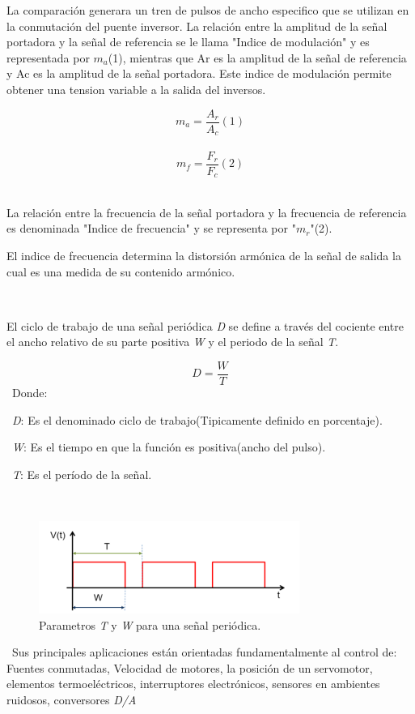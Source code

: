 \documentclass[12pt,letterpaper]{article}
\begin{document}
La comparación generara un tren de pulsos de ancho especifico que se utilizan en la conmutación del puente inversor. La relación entre la amplitud de la señal portadora y la señal de referencia se le llama "Indice de modulación" y es representada por $m_a$(1), mientras que Ar es la amplitud de la señal de referencia y Ac es la amplitud de la señal portadora. Este indice de modulación permite obtener una tension variable a la salida del inversos.
\

$$m_a = \frac{A_r}{A_c}(1)$$
\
$$m_f = \frac{F_r}{F_c}(2)$$
\

La relación entre la frecuencia de la señal portadora y la frecuencia de referencia es denominada "Indice de frecuencia" y se representa por "$m_r$"(2).
\

El indice de frecuencia determina la distorsión armónica de la señal de salida la cual es una medida de su contenido armónico.
\

\

El ciclo de trabajo de una señal periódica \textit{D} se define a través del cociente entre el ancho relativo de su parte positiva \textit{W} y el periodo de la señal \textit{T}.
\

$$D=\frac{W}{T}$$
\
Donde:

\
\textit{D}: Es el denominado ciclo de trabajo(Tipicamente definido en porcentaje).

\
\textit{W}: Es el tiempo en que la función es positiva(ancho del pulso).

\
\textit{T}: Es el período de la señal.

\

\begin{figure}[h!]
\begin{center}
\includegraphics[scale=0.8]{Parametros.png} 
\caption{Parametros \textit{T} y \textit{W} para una señal periódica.}
\end{center}
\end{figure}

\
Sus principales aplicaciones están orientadas fundamentalmente al control de: Fuentes conmutadas, Velocidad de motores, la posición de un servomotor, elementos termoeléctricos, interruptores electrónicos, sensores en ambientes ruidosos, conversores \textit{D/A}
\end{document}
